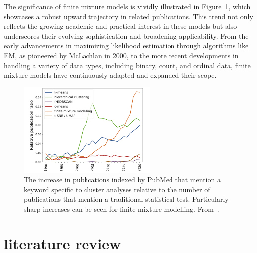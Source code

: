 \documentclass{article}
\begin{document}
The significance of finite mixture models is vividly illustrated in Figure~\ref{fig:trend}, which showcases a robust upward trajectory in related publications. This trend not only reflects the growing academic and practical interest in these models but also underscores their evolving sophistication and broadening applicability. From the early advancements in maximizing likelihood estimation through algorithms like EM, as pioneered by McLachlan in 2000, to the more recent developments in handling a variety of data types, including binary, count, and ordinal data, finite mixture models have continuously adapted and expanded their scope.

\begin{figure}[ht!] %
    \centering %
    \includegraphics[width=0.6\textwidth]{images/trend.png} %
    \caption{The increase in publications indexed by PubMed that mention a keyword specific to cluster analyses relative to the number of publications 
    that mention a traditional statistical test. 
    Particularly sharp increases can be seen for finite mixture modelling.
    From~\cite{dalmaijer2022statistical}.} %
    \label{fig:trend} %
  \end{figure}


\section{literature review}

\end{document}
